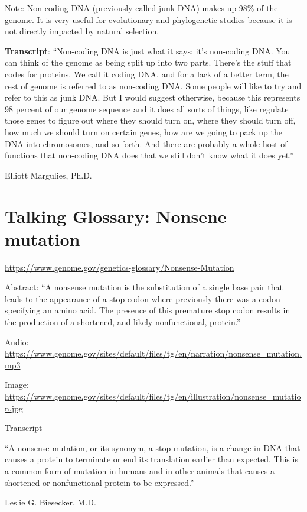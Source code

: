 \documentclass[
]{book}
\begin{document}
Note: Non-coding DNA (previously called junk DNA) makes up 98\% of the genome. It is very useful for evolutionary and phylogenetic studies because it is not directly impacted by natural selection.

\textbf{Transcript}: ``Non-coding DNA is just what it says; it's non-coding DNA. You can think of the genome as being split up into two parts. There's the stuff that codes for proteins. We call it coding DNA, and for a lack of a better term, the rest of genome is referred to as non-coding DNA. Some people will like to try and refer to this as junk DNA. But I would suggest otherwise, because this represents 98 percent of our genome sequence and it does all sorts of things, like regulate those genes to figure out where they should turn on, where they should turn off, how much we should turn on certain genes, how are we going to pack up the DNA into chromosomes, and so forth. And there are probably a whole host of functions that non-coding DNA does that we still don't know what it does yet.''

Elliott Margulies, Ph.D.

\hypertarget{talking-glossary-nonsene-mutation}{%
\section{Talking Glossary: Nonsene mutation}\label{talking-glossary-nonsene-mutation}}

\url{https://www.genome.gov/genetics-glossary/Nonsense-Mutation}

Abstract: ``A nonsense mutation is the substitution of a single base pair that leads to the appearance of a stop codon where previously there was a codon specifying an amino acid. The presence of this premature stop codon results in the production of a shortened, and likely nonfunctional, protein.''

Audio: \url{https://www.genome.gov/sites/default/files/tg/en/narration/nonsense_mutation.mp3}

Image: \url{https://www.genome.gov/sites/default/files/tg/en/illustration/nonsense_mutation.jpg}

Transcript

``A nonsense mutation, or its synonym, a stop mutation, is a change in DNA that causes a protein to terminate or end its translation earlier than expected. This is a common form of mutation in humans and in other animals that causes a shortened or nonfunctional protein to be expressed.''

Leslie G. Biesecker, M.D.
\end{document}
